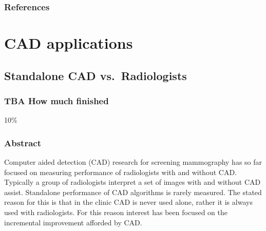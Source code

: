 \documentclass[
]{book}
\begin{document}
\hypertarget{rsm-3-fits-references}{%
\section{References}\label{rsm-3-fits-references}}

\hypertarget{part-cad-applications}{%
\part*{CAD applications}\label{part-cad-applications}}

\hypertarget{standalone-cad-radiologists}{%
\chapter{Standalone CAD vs.~Radiologists}\label{standalone-cad-radiologists}}

\hypertarget{standalone-cad-radiologists-how-much-finished}{%
\section{TBA How much finished}\label{standalone-cad-radiologists-how-much-finished}}

10\%

\hypertarget{standalone-cad-radiologists-abstract}{%
\section{Abstract}\label{standalone-cad-radiologists-abstract}}

Computer aided detection (CAD) research for screening mammography has so far focused on measuring performance of radiologists with and without CAD. Typically a group of radiologists interpret a set of images with and without CAD assist. Standalone performance of CAD algorithms is rarely measured. The stated reason for this is that in the clinic CAD is never used alone, rather it is always used with radiologists. For this reason interest has been focused on the incremental improvement afforded by CAD.
\end{document}
